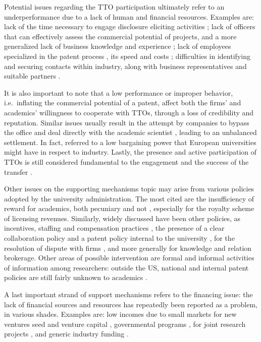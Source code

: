Potential issues regarding the TTO participation ultimately refer to an underperformance due to a lack of human and financial resources. Examples are: lack of the time necessary to engage disclosure eliciting activities \citep{Siegel2007}; lack of officers that can effectively assess the commercial potential of projects, and a more generalized lack of business knowledge and experience \citep{Hertzfeld2006}; lack of employees specialized in the patent process \citep{Baldini2007}, its speed and costs \citep{Fini2009}; difficulties in identifying and securing contacts within industry, along with business representatives \citep{Markman2005} and suitable partners \citep{Muscio2010}.

It is also important to note that a low performance or improper behavior, i.e.\ inflating the commercial potential of a patent, affect both the firms' and academics' willingness to cooperate with TTOs, through a loss of credibility and reputation. Similar issues usually result in the attempt by companies to bypass the office and deal directly with the academic scientist \citep{Link2007}, leading to an unbalanced settlement. In fact, \citet{Baldini2006} referred to a low bargaining power that European universities might have in respect to industry. Lastly, the presence and active participation of TTOs is still considered fundamental to the engagement and the success of the transfer \citep{Muscio2010}.

Other issues on the supporting mechanisms topic may arise from various policies adopted by the university administration. The most cited are the insufficiency of reward for academics, both pecuniary and not \citep{Siegel2007}, especially for the royalty scheme of licensing revenues. Similarly, widely discussed have been other policies, as incentives, staffing and compensation practices \citep{Baldini2007}, the presence of a clear collaboration policy and a patent policy internal to the university \citep{Muscio2008,Muscio2010,Muscio2013}, for the resolution of dispute with firms \citep{Belenzon2007}, and more generally for knowledge and relation brokerage. Other areas of possible intervention are formal and informal activities of information among researchers: outside the US, national and internal patent policies are still fairly unknown to academics \citep{Baldini2006}.

A last important strand of support mechanisms refers to the financing issue: the lack of financial sources and resources has repeatedly been reported as a problem, in various shades. Examples are: low incomes due to small markets for new ventures \citep{Perez2003} seed and venture capital \citep{Rasmussen2006}, governmental programs \citep{Muscio2008}, for joint research projects \citep{Muscio2010}, and generic industry funding \citep{Muscio2013}.

